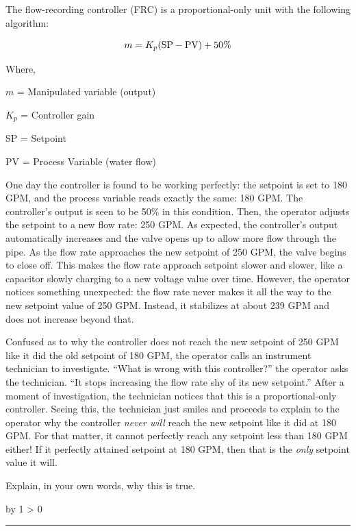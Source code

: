 \documentclass[12pt,a4paper]{article}
\def\oppgave{
            \advance\questnum by 1
            \ifnum \questnum > 0
                 \hrule
                 \vskip 3pt
                 \leftline{Oppgave \the\questnum}
                 \vskip 3pt \fi}
\begin{document}
The flow-recording controller (FRC) is a proportional-only unit with the following algorithm:

$$m = K_p (\hbox{SP} - \hbox{PV}) + 50\hbox{\%}$$

\noindent
Where,

$m$ = Manipulated variable (output)

$K_p$ = Controller gain

SP = Setpoint

PV = Process Variable (water flow)

\vskip 10pt

One day the controller is found to be working perfectly: the setpoint is set to 180 GPM, and the process variable reads exactly the same: 180 GPM.  The controller's output is seen to be 50\% in this condition.  Then, the operator adjusts the setpoint to a new flow rate: 250 GPM.  As expected, the controller's output automatically increases and the valve opens up to allow more flow through the pipe.  As the flow rate approaches the new setpoint of 250 GPM, the valve begins to close off.  This makes the flow rate approach setpoint slower and slower, like a capacitor slowly charging to a new voltage value over time.  However, the operator notices something unexpected: the flow rate never makes it all the way to the new setpoint value of 250 GPM.  Instead, it stabilizes at about 239 GPM and does not increase beyond that.

Confused as to why the controller does not reach the new setpoint of 250 GPM like it did the old setpoint of 180 GPM, the operator calls an instrument technician to investigate.  ``What is wrong with this controller?'' the operator asks the technician.  ``It stops increasing the flow rate shy of its new setpoint.''  After a moment of investigation, the technician notices that this is a proportional-only controller.  Seeing this, the technician just smiles and proceeds to explain to the operator why the controller {\it never will} reach the new setpoint like it did at 180 GPM.  For that matter, it cannot perfectly reach any setpoint less than 180 GPM either!  If it perfectly attained setpoint at 180 GPM, then that is the {\it only} setpoint value it will.

Explain, in your own words, why this is true.

\vskip 10pt \filbreak 
\oppgave{} 
\end{document}
